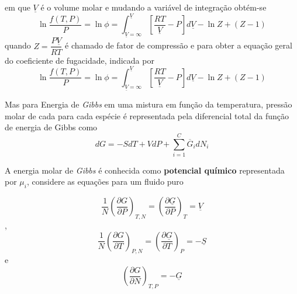 em que $\underline{V}$ é o volume molar e mudando a variável de integração obtém-se
\begin{equation}\label{eq:fugacidade_8}
\ln\dfrac{f(T,P)}{P} =\ln\phi = \int_{\underline{V}=\infty}^{\underline{V}}\left[\dfrac{RT}{\underline{V}}-P\right] d\underline{V}-\ln Z+(Z-1)
\end{equation}
quando $Z=\dfrac{P\underline{V}}{RT}$ é chamado de fator de compressão e para obter a equação geral do coeficiente de fugacidade, indicada por
\begin{equation}\label{eq:fugacidade_9}
\ln\dfrac{f(T,P)}{P} =\ln\phi = \int_{\underline{V}=\infty}^{\underline{V}}\left[\dfrac{RT}{\underline{V}}-P\right] d\underline{V}-\ln Z+(Z-1)
\end{equation}
\cite{Sandlel}

Mas para Energia de \textit{Gibbs} em uma mistura em função da temperatura, pressão molar de cada para cada espécie é representada pela diferencial total da função de energia de Gibbs como 
\begin{equation}\label{eq:mistura_1}
dG=-SdT+VdP+\sum_{i=1}^{C}\overline{G}_{i}dN_{i}
\end{equation}

A energia molar de \textit{Gibbs} é conhecida como \textbf{potencial químico} representada por $\mu_i$, considere as equações para um fluido puro

\begin{equation}
    \frac{1}{N}\left(\frac{\partial G}{\partial P}\right)_{T,N}=\left(\frac{\partial\underline{G}}{\partial P}\right)_{T}=\underline{V}
\end{equation}
,
\begin{equation}
    \frac{1}{N}\left(\frac{\partial G}{\partial T}\right)_{P,N}=\left(\frac{\partial\underline{G}}{\partial T}\right)_{P}=-\underline{S}
\end{equation}
e
\begin{equation}
    \left(\frac{\partial G}{\partial N}\right)_{T,P}=-\underline{G}
\end{equation}

